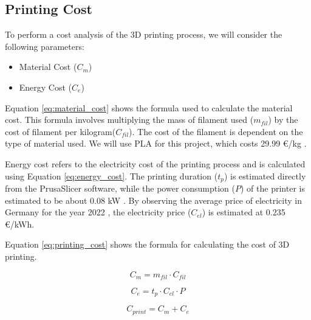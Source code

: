 \subsection{Printing Cost}
\label{subsec:printing_cost}

To perform a cost analysis of the 3D printing process, we will consider the following parameters:

\begin{itemize}
  \item Material Cost ($C_m$)
  \item Energy Cost ($C_e$)
\end{itemize}

Equation \ref{eq:material_cost} shows the formula used to calculate the material cost. This formula involves multiplying the mass of filament used ($m_{fil}$) by the cost of filament per kilogram($C_{fil}$). The cost of the filament is dependent on the type of material used. We will use PLA for this project, which costs 29.99 €/kg \cite{PrusaCost}.

Energy cost refers to the electricity cost of the printing process and is calculated using Equation \ref{eq:energy_cost}. The printing duration ($t_p$) is estimated directly from the PrusaSlicer software, while the power consumption ($P$) of the printer is estimated to be about 0.08 kW \cite{Prusa}. By observing the average price of electricity in Germany for the year 2022 \cite{NordPool}, the electricity price ($C_{el}$) is estimated at 0.235 €/kWh.

Equation \ref{eq:printing_cost} shows the formula for calculating the cost of 3D printing.

\begin{equation}
  \label{eq:material_cost}
  C_{m} = m_{fil}\cdot C_{fil}
\end{equation}

\begin{equation}
  \label{eq:energy_cost}
  C_{e} = t_{p}\cdot C_{el}\cdot P
\end{equation}

\begin{equation}
  \label{eq:printing_cost}
  C_{print} = C_{m} + C_{e}
\end{equation}



